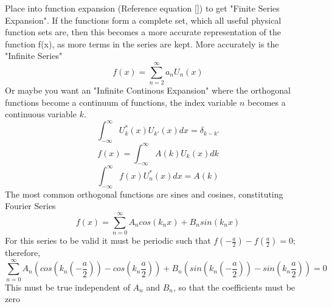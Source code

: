 \documentclass[12pt]{article}
\begin{document}
    Place into function expansion (Reference equation \ref{}) to get "Finite Series Expansion". If the functions form a complete set, which all useful physical function sets are, then this becomes a more accurate representation of the function f(x), as more terms in the series are kept.
    \newline More accurately is the "Infinite Series"
    \begin{equation} \label{eq: 11-11-9}
        f(x) = \sum_{n=2}^{\infty} a_n U_n(x)
    \end{equation}
    Or maybe you want an "Infinite Continous Expansion" where the orthogonal functions become a continuum of functions, the index variable $n$ becomes a continuous variable $k$.
    \begin{equation} \label{eq: 11-11-10}
        \int_{-\infty}^{\infty} U_k^*(x) U_{k'}(x)dx = \delta_{k-k'}
    \end{equation}    
    \begin{equation} \label{eq: 11-11-11}
        f(x) = \int_{-\infty}^{\infty} A(k) U_k(x) dk
    \end{equation}
    \begin{equation} \label{eq: 11-11-12}
        \int_{-\infty}^{\infty} f(x)U_n^*(x) dx = A(k)
    \end{equation}    
    The most common orthogonal functions are sines and cosines, constituting Fourier Series
    \begin{equation} \label{eq: 11-11-13}
        f(x) = \sum_{n=0}^{\infty} A_n cos(k_n x) + B_n sin(k_n x)
    \end{equation}        
    For this series to be valid it must be periodic such that $f(-\frac{a}{2})-f(\frac{a}{2}) = 0$; therefore,
    \begin{equation} \label{eq: 11-11-14}
        \sum_{n=0}^{\infty} A_n (cos(k_n (-\frac{a}{2})) - cos(k_n \frac{a}{2})) + B_n (sin(k_n (-\frac{a}{2})) - sin(k_n \frac{a}{2})) = 0
    \end{equation}        
    This must be true independent of $A_n$ and $B_n$, so that the coefficients must be zero
\end{document}
